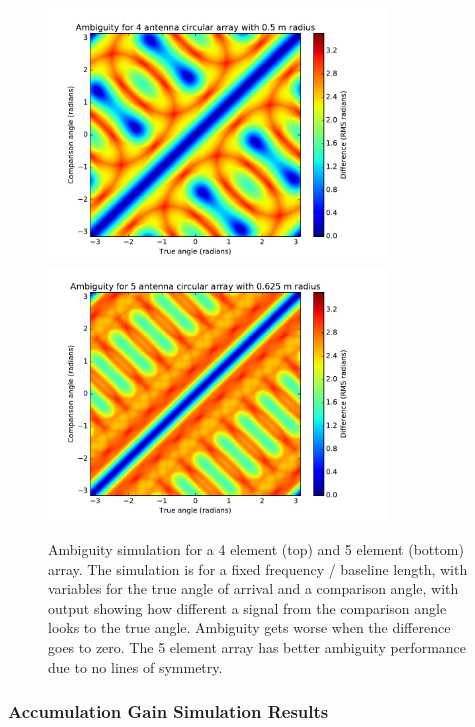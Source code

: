 \begin{figure}[H]
  \centering
  \includegraphics[width=0.8\textwidth]{4element-fixedbaseline}
  \includegraphics[width=0.8\textwidth]{5element-fixedbaseline}
  \caption{Ambiguity simulation for a 4 element (top) and 5 element (bottom) array. The simulation is for a fixed frequency / baseline length, with variables for the true angle of arrival and a comparison angle, with output showing how different a signal from the comparison angle looks to the true angle. Ambiguity gets worse when the difference goes to zero. The 5 element array has better ambiguity performance due to no lines of symmetry.}
  \label{fig:system-design:4-vs-5-element-fixed-baseline}
\end{figure}


\subsubsection{Accumulation Gain Simulation Results}

